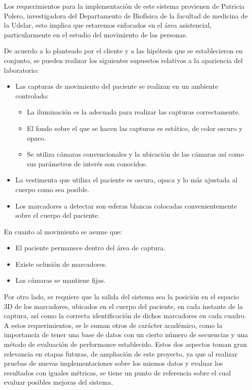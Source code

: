 Los requerimientos para la implementación de este sistema provienen de Patricia Polero, investigadora del Departamento de Biofísica de la facultad de medicina de la Udelar, esto implica que estaremos enfocados en el área asistencial, particularmente en el estudio del movimiento de las personas.

De acuerdo a lo planteado por el cliente y a las hipótesis que se establecieron en conjunto, se pueden realizar los siguientes supuestos relativos a la apariencia del laboratorio:
\begin{itemize}
\item Las capturas de movimiento del paciente se realizan en un ambiente controlado:\vspace{-0.2cm}
	\begin{itemize}
		 \item La iluminación es la adecuada para realizar las  capturas correctamente.
		 \item El fondo sobre el que se hacen las capturas es estático, de color oscuro y opaco.		 
		 \item Se utiliza cámaras convencionales y la ubicación de las cámaras así como sus parámetros de interés son conocidos.
	\end{itemize}
	\vspace{-0.2cm}
\item La vestimenta que utiliza el paciente es oscura, opaca y lo más ajustada al cuerpo como sea posible.\vspace{-0.1cm}
\item Los marcadores a detectar son esferas blancas colocadas convenientemente sobre el cuerpo del paciente.
\end{itemize}

En cuanto al movimiento se asume que:
\begin{itemize}
\item El paciente permanece dentro del área de captura.\vspace{-0.1cm}
\item Existe oclusión de marcadores.\vspace{-0.1cm}
\item Las cámaras se mantiene fijas.
\end{itemize}

Por otro lado, se requiere que la salida del sistema sea la posición en el espacio 3D de los marcadores, ubicados en el cuerpo del paciente, en cada instante de la captura, así como la correcta identificación de dichos marcadores en cada cuadro. A estos requerimientos, se le suman otros de carácter académico, como la importancia de tener una base de datos con un cierto número de secuencias y una método de evaluación de performance establecido. Estos dos aspectos toman gran relevancia en etapas futuras, de ampliación de este proyecto, ya que al realizar pruebas  de nuevas implementaciones sobre los mismos datos y evaluar los resultados con iguales métricas, se tiene un punto de referencia sobre el cual evaluar posibles mejoras del sistema.

